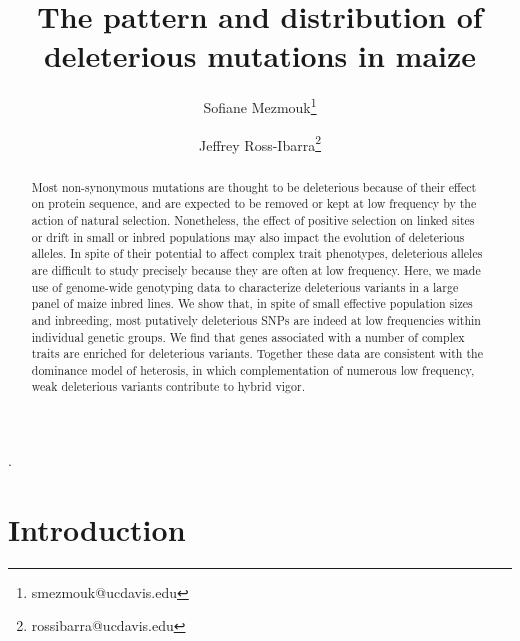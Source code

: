 \documentclass[12pt]{article}
\title{The pattern and distribution of deleterious mutations in maize}
\author[1]{Sofiane Mezmouk\thanks{smezmouk@ucdavis.edu}}
\author[1,2]{Jeffrey Ross-Ibarra\thanks{rossibarra@ucdavis.edu}}
\affil[1]{Department of Plant Sciences, University of California Davis}
\affil[2]{Center for Population Biology and Genome Center, University of California Davis}
\date{}
\begin{document}
\maketitle


\begin{abstract} 
Most non-synonymous mutations are thought to be deleterious because of their effect on protein sequence, and are expected to be removed or kept at low frequency by the action of natural selection.
Nonetheless, the effect of positive selection on linked sites or drift in small or inbred populations may also impact the evolution of deleterious alleles. 
In spite of their potential to affect complex trait phenotypes, deleterious alleles are difficult to study precisely because they are often at low frequency. 
Here, we made use of genome-wide genotyping data to characterize deleterious variants in a large panel of maize inbred lines.  
We show that, in spite of small effective population sizes and inbreeding, most  putatively deleterious SNPs are indeed at low frequencies within individual genetic groups. 
We find that genes associated with a number of complex traits are enriched for deleterious variants. 
Together these data are consistent with the dominance model of heterosis, in which complementation of numerous low frequency, weak deleterious variants contribute to hybrid vigor.
\end{abstract}

\begin{footnotesize}
.

\end{footnotesize}

\newpage
\section*{Introduction}
\end{document}
